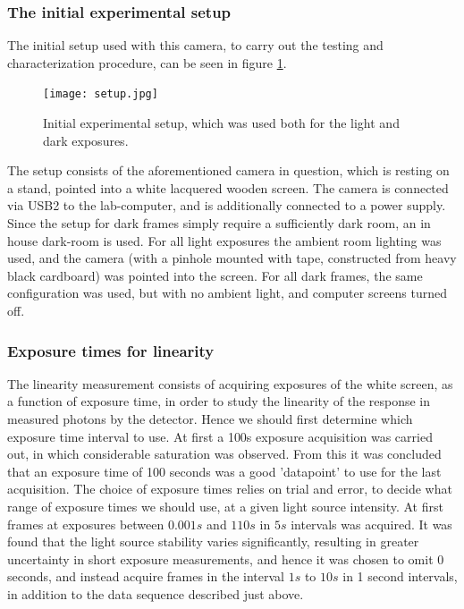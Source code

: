 \documentclass[../main.tex]{subfiles}
\begin{document}
		\subsubsection{The initial experimental setup}
		The initial setup used with this camera, to carry out the testing and characterization procedure, can be seen in figure \ref{fig:setup}. 
		
		\begin{figure}
			\centering
			\texttt{[image: setup.jpg]}
			\caption{Initial experimental setup, which was used both for the light and dark exposures.}
			\label{fig:setup}
		\end{figure}
		
		The setup consists of the aforementioned camera in question, which is resting on a stand, pointed into a white lacquered wooden screen. The camera is connected via USB2 to the lab-computer, and is additionally connected to a power supply. Since the setup for dark frames simply require a sufficiently dark room, an in house dark-room is used.
		For all light exposures the ambient room lighting was used, and the camera (with a pinhole mounted with tape, constructed from heavy black cardboard) was pointed into the screen. 
		For all dark frames, the same configuration was used, but with no ambient light, and computer screens turned off.
		
		\subsubsection{Exposure times for linearity}
		The linearity measurement consists of acquiring exposures of the white screen, as a function of exposure time, in order to study the linearity of the response in measured photons by the detector. Hence we should first determine which exposure time interval to use. At first a 100s exposure acquisition was carried out, in which considerable saturation was observed. From this it was concluded that an exposure time of 100 seconds was a good 'datapoint' to use for the last acquisition. The choice of exposure times relies on trial and error, to decide what range of exposure times we should use, at a given light source intensity. At first frames at exposures between $0.001s$ and $110s$ in $5s$ intervals was acquired. It was found that the light source stability varies significantly, resulting in greater uncertainty in short exposure measurements, and hence it was chosen to omit $0$ seconds, and instead acquire frames in the interval $1s$ to $10s$ in 1 second intervals, in addition to the data sequence described just above. 
		
\end{document}
